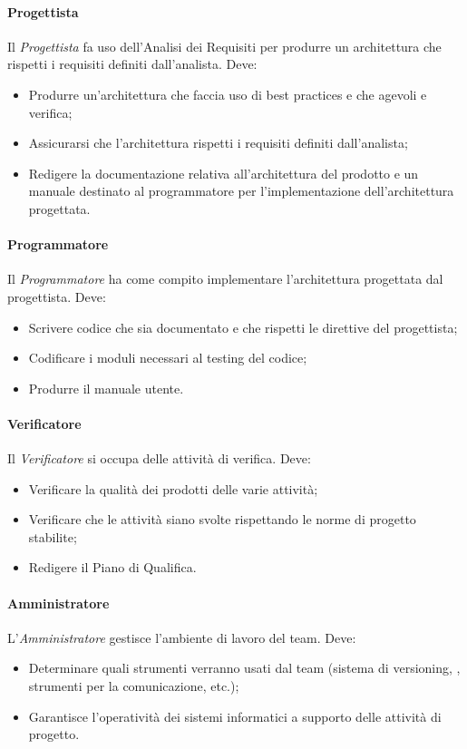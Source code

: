\paragraph{Progettista} \Spazio
Il \emph{Progettista} fa uso dell'Analisi dei Requisiti per produrre un architettura che rispetti i requisiti definiti dall'analista. Deve:
\begin{itemize}
\item Produrre un'architettura che faccia uso di best practices e che agevoli  e verifica;
\item Assicurarsi che l'architettura rispetti i requisiti definiti dall'analista;
\item Redigere la documentazione relativa all'architettura del prodotto e un manuale destinato al programmatore per l'implementazione dell'architettura progettata.
\end{itemize}

\paragraph{Programmatore} \Spazio
Il \emph{Programmatore} ha come compito implementare l'architettura progettata dal progettista. Deve:
\begin{itemize}
\item Scrivere codice che sia documentato e che rispetti le direttive del progettista;
\item Codificare i moduli necessari al testing del codice;
\item Produrre il manuale utente.
\end{itemize}

\paragraph{Verificatore} \Spazio
Il \emph{Verificatore} si occupa delle attività di verifica. Deve:
\begin{itemize}
\item Verificare la qualità dei prodotti delle varie attività;
\item Verificare che le attività siano svolte rispettando le norme di progetto stabilite;
\item Redigere il Piano di Qualifica.
\end{itemize}

\paragraph{Amministratore} \Spazio
L'\emph{Amministratore} gestisce l'ambiente di lavoro del team. Deve:
\begin{itemize}
\item Determinare quali strumenti verranno usati dal team (sistema di versioning, , strumenti per la comunicazione, etc.);
\item Garantisce l'operatività dei sistemi informatici a supporto delle attività di progetto.
\end{itemize}

